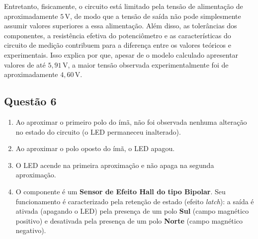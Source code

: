 Entretanto, fisicamente, o circuito está limitado pela tensão de alimentação de aproximadamente \(5\,\mathrm{V}\), de modo que a tensão de saída não pode simplesmente assumir valores superiores a essa alimentação. Além disso, as tolerâncias dos componentes, a resistência efetiva do potenciômetro e as características do circuito de medição contribuem para a diferença entre os valores teóricos e experimentais. Isso explica por que, apesar de o modelo calculado apresentar valores de até \(5,91\,\mathrm{V}\), a maior tensão observada experimentalmente foi de aproximadamente \(4,60\,\mathrm{V}\).



\subsection*{Questão 6}
\begin{enumerate}
    \item[\textbf{a)}] Ao aproximar o primeiro polo do ímã, não foi observada nenhuma alteração no estado do circuito (o LED permaneceu inalterado).
    
    \item[\textbf{b)}] Ao aproximar o polo oposto do ímã, o LED apagou.
    
    \item[\textbf{c)}] O LED acende na primeira aproximação e não apaga na segunda aproximação.
    
    \item[\textbf{d)}] O componente é um \textbf{Sensor de Efeito Hall do tipo Bipolar}. Seu funcionamento é caracterizado pela retenção de estado (efeito \textit{latch}): a saída é ativada (apagando o LED) pela presença de um polo \textbf{Sul} (campo magnético positivo) e desativada pela presença de um polo \textbf{Norte} (campo magnético negativo).

\end{enumerate}

